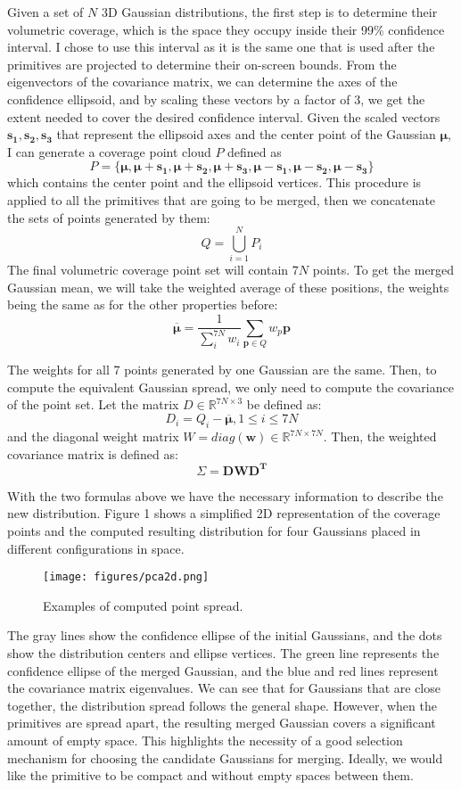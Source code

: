 Given a set of $N$ 3D Gaussian distributions, the first step is to determine their volumetric coverage, which is the space they occupy inside their 99\% confidence interval. I chose to use this interval as it is the same one that is used after the primitives are projected to determine their on-screen bounds. From the eigenvectors of the covariance matrix, we can determine the axes of the confidence ellipsoid, and by scaling these vectors by a factor of 3, we get the extent needed to cover the desired confidence interval. Given the scaled vectors $\bm{s_1}, \bm{s_2}, \bm{s_3}$ that represent the ellipsoid axes and the center point of the Gaussian $\bm{\mu}$, I can generate a coverage point cloud $P$ defined as 
\[P = \{\bm{\mu}, \bm{\mu} + \bm{s_1}, \bm{\mu} + \bm{s_2}, \bm{\mu} + \bm{s_3}, \bm{\mu} - \bm{s_1},\bm{ \mu} - \bm{s_2}, \bm{\mu} - \bm{s_3}\}\]
which contains the center point and the ellipsoid vertices. This procedure is applied to all the primitives that are going to be merged, then we concatenate the sets of points generated by them:
\[Q = \bigcup_{i=1}^N P_i\]
The final volumetric coverage point set will contain $7N$ points. To get the merged Gaussian mean, we will take the weighted average of these positions, the weights being the same as for the other properties before:
\[
\bm{\overline{\mu}} = \frac{1}{\sum_i^{7N} w_i} \sum_{\bm{p} \in Q} w_p\bm{p} 
\]

The weights for all 7 points generated by one Gaussian are the same. Then, to compute the equivalent Gaussian spread, we only need to compute the covariance of the point set. Let the matrix $D \in \mathbb{R}^{7N \times 3}$ be defined as:
\[
D_i = Q_i - \bm{\overline{\mu}}, 1 \leq i \leq 7N
\]
and the diagonal weight matrix $W = diag(\bm{w}) \in \mathbb{R}^{7N \times 7N}$. Then, the weighted covariance matrix \cite{weighted_mean} is defined as:
\[
\Sigma = \bm{DWD^T}
\]

With the two formulas above we have the necessary information to describe the new distribution. Figure 1 shows a simplified 2D representation of the coverage points and the computed resulting distribution for four Gaussians placed in different configurations in space.

\begin{figure}[H]
    \centering
    \texttt{[image: figures/pca2d.png]}
    \caption{Examples of computed point spread.}
    \label{fig:pca2d}
\end{figure}

The gray lines show the confidence ellipse of the initial Gaussians, and the dots show the distribution centers and ellipse vertices. The green line represents the confidence ellipse of the merged Gaussian, and the blue and red lines represent the covariance matrix eigenvalues. We can see that for Gaussians that are close together, the distribution spread follows the general shape. However, when the primitives are spread apart, the resulting merged Gaussian covers a significant amount of empty space. This highlights the necessity of a good selection mechanism for choosing the candidate Gaussians for merging. Ideally, we would like the primitive to be compact and without empty spaces between them.